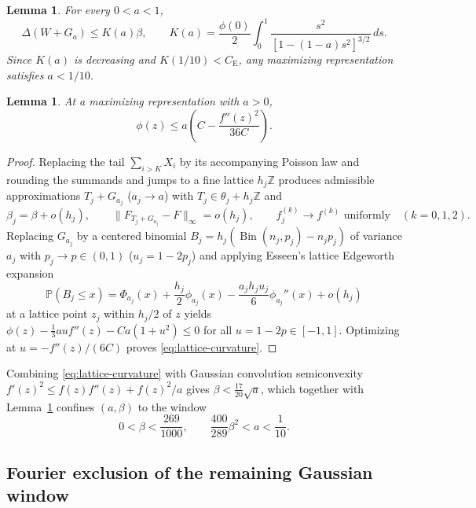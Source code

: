\documentclass[11pt]{article}
\numberwithin{equation}{section}
\newtheorem{lemma}[theorem]{Lemma}
\theoremstyle{definition}
\DeclareMathOperator{\Bin}{Bin}
\newcommand{\Pp}{\mathbb P}
\newcommand{\Z}{\mathbb Z}
\newcommand{\ce}{C_{\mathrm E}}
\newcommand{\phz}{\phi(0)}
\begin{document}
\begin{lemma}\label{lem:gauss-large}
For every $0<a<1$,
\[
 \Delta(W+G_a)\le K(a)\beta,\qquad
 K(a)=\frac{\phz}{2}\int_0^1
            \frac{s^2}{[1-(1-a)s^2]^{3/2}}\,ds.
\]
Since $K(a)$ is decreasing and $K(1/10)<\ce$, any maximizing representation
satisfies $a<1/10$.
\end{lemma}

\begin{lemma}\label{lem:lattice-gauss}
At a maximizing representation with $a>0$,
\begin{equation}\label{eq:lattice-curvature}
             \phi(z)\le a\left(C-\frac{f''(z)^2}{36C}\right).
\end{equation}
\end{lemma}
\begin{proof}
Replacing the tail $\sum_{i>K}X_i$ by its accompanying Poisson law and
rounding the summands and jumps to a fine lattice $h_j\Z$ produces admissible
approximations $T_j+G_{a_j}$ ($a_j\to a$) with $T_j\in\theta_j+h_j\Z$ and
\begin{equation}\label{eq:lattice-approx}
 \beta_j=\beta+o(h_j),\qquad
 \|F_{T_j+G_{a_j}}-F\|_\infty=o(h_j),\qquad
 f_j^{(k)}\to f^{(k)}\text{ uniformly}\quad(k=0,1,2).
\end{equation}
Replacing $G_{a_j}$ by a centered binomial $B_j=h_j(\Bin(n_j,p_j)-n_jp_j)$ of
variance $a_j$ with $p_j\to p\in(0,1)$ ($u_j=1-2p_j$) and applying Esseen's
lattice Edgeworth expansion \citep[eq.~(3)]{DinevMattner2013}
\begin{equation}\label{eq:binomial-expansion}
 \Pp(B_j\le x)=\Phi_{a_j}(x)+\frac{h_j}{2}\phi_{a_j}(x)
              -\frac{a_jh_ju_j}{6}\phi_{a_j}''(x)+o(h_j)
\end{equation}
at a lattice point $z_j$ within $h_j/2$ of $z$ yields
$\phi(z)-\frac13auf''(z)-Ca(1+u^2)\le0$ for all $u=1-2p\in[-1,1]$. Optimizing
at $u=-f''(z)/(6C)$ proves \eqref{eq:lattice-curvature}.
\end{proof}

Combining \eqref{eq:lattice-curvature} with Gaussian convolution
semiconvexity $f'(z)^2\le f(z)f''(z)+f(z)^2/a$ gives
$\beta<\frac{17}{20}\sqrt a$, which together with Lemma~\ref{lem:gauss-large}
confines $(a,\beta)$ to the window
\begin{equation}\label{eq:gauss-window}
         0<\beta<\frac{269}{1000},\qquad
         \frac{400}{289}\beta^2<a<\frac1{10}.
\end{equation}

\subsection{Fourier exclusion of the remaining Gaussian window}
\end{document}
